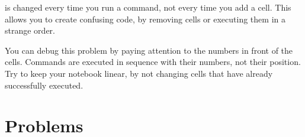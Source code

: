 \documentclass[justified, nobib]{tufte-handout}
\begin{document}
 is changed every time you run a command, not
every time you add a cell. This allows you to create confusing code, by removing
cells or executing them in a strange order.

\begin{adjustwidth}{2.5em}{0pt}

\end{adjustwidth}

\noindent
You can debug this problem by paying attention to the numbers in front of the
cells. Commands are executed in sequence with their numbers, not their
position. Try to keep your notebook linear, by not changing cells that have
already successfully executed.

\pagebreak

\section*{Problems}
\vspace{-0.5cm}
\end{document}

